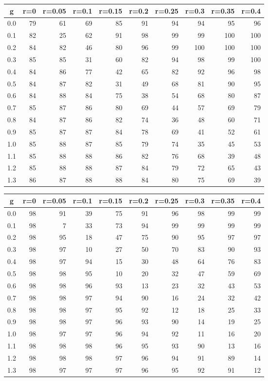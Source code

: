 %
\begin{table}[!tbp]
 \begin{center}
 \begin{tabular}{rrrrrrrrrr}\hline\hline
\multicolumn{1}{c}{g}&\multicolumn{1}{c}{r=0}&\multicolumn{1}{c}{r=0.05}&\multicolumn{1}{c}{r=0.1}&\multicolumn{1}{c}{r=0.15}&\multicolumn{1}{c}{r=0.2}&\multicolumn{1}{c}{r=0.25}&\multicolumn{1}{c}{r=0.3}&\multicolumn{1}{c}{r=0.35}&\multicolumn{1}{c}{r=0.4}\tabularnewline
\hline
0.0&79&61&69&85&91&94& 94& 95& 96\tabularnewline
0.1&82&25&62&91&98&99& 99&100&100\tabularnewline
0.2&84&82&46&80&96&99&100&100&100\tabularnewline
0.3&85&85&31&60&82&94& 98& 99&100\tabularnewline
0.4&84&86&77&42&65&82& 92& 96& 98\tabularnewline
0.5&84&87&82&31&49&68& 81& 90& 95\tabularnewline
0.6&84&88&84&75&38&54& 68& 80& 87\tabularnewline
0.7&85&87&86&80&69&44& 57& 69& 79\tabularnewline
0.8&84&87&86&82&74&36& 48& 60& 71\tabularnewline
0.9&85&87&87&84&78&69& 41& 52& 61\tabularnewline
1.0&85&88&87&85&79&74& 35& 45& 53\tabularnewline
1.1&85&88&88&86&82&76& 68& 39& 48\tabularnewline
1.2&85&88&88&87&84&79& 72& 65& 43\tabularnewline
1.3&86&87&88&88&84&80& 75& 69& 39\tabularnewline
\hline
\end{tabular}

\end{center}

\end{table}

%
\begin{table}[!tbp]
 \begin{center}
 \begin{tabular}{rrrrrrrrrr}\hline\hline
\multicolumn{1}{c}{g}&\multicolumn{1}{c}{r=0}&\multicolumn{1}{c}{r=0.05}&\multicolumn{1}{c}{r=0.1}&\multicolumn{1}{c}{r=0.15}&\multicolumn{1}{c}{r=0.2}&\multicolumn{1}{c}{r=0.25}&\multicolumn{1}{c}{r=0.3}&\multicolumn{1}{c}{r=0.35}&\multicolumn{1}{c}{r=0.4}\tabularnewline
\hline
0.0&98&91&39&75&91&96&98&99&99\tabularnewline
0.1&98& 7&33&73&94&99&99&99&99\tabularnewline
0.2&98&95&18&47&75&90&95&97&97\tabularnewline
0.3&98&97&10&27&50&70&83&90&93\tabularnewline
0.4&98&97&94&15&30&48&64&76&83\tabularnewline
0.5&98&98&95&10&20&32&47&59&69\tabularnewline
0.6&98&98&96&93&13&23&32&43&53\tabularnewline
0.7&98&98&97&94&90&16&24&32&42\tabularnewline
0.8&98&98&97&95&92&12&18&25&33\tabularnewline
0.9&98&98&97&96&93&90&14&19&25\tabularnewline
1.0&98&97&97&96&94&92&11&16&20\tabularnewline
1.1&98&98&98&96&95&93&90&13&16\tabularnewline
1.2&98&98&98&97&96&94&91&89&14\tabularnewline
1.3&98&97&97&97&96&95&92&91&12\tabularnewline
\hline
\end{tabular}

\end{center}

\end{table}

